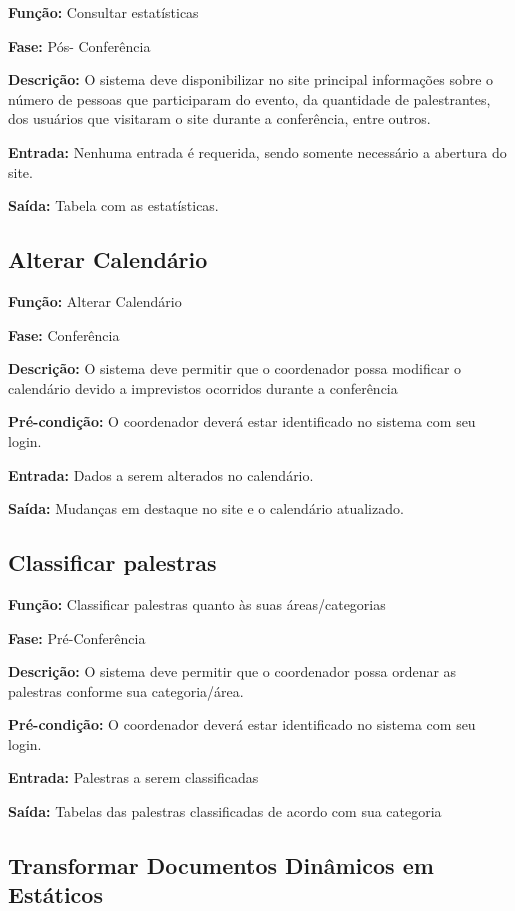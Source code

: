 \documentclass[letter]{article}
\begin{document}
\textbf{Função:}  Consultar estatísticas

\textbf{Fase:}  Pós- Conferência

\textbf{Descrição:}  O sistema deve disponibilizar no site principal informações sobre o número de pessoas que participaram do evento, da quantidade de palestrantes, dos usuários que visitaram o site durante a conferência, entre outros.

\textbf{Entrada:}  Nenhuma entrada é requerida, sendo somente necessário a abertura do site.

\textbf{Saída:}  Tabela com as estatísticas.
 

\subsection{Alterar Calendário}

\textbf{Função:} Alterar Calendário

\textbf{Fase:}  Conferência

\textbf{Descrição:}  O sistema deve permitir que o coordenador possa modificar o calendário devido a imprevistos ocorridos durante a conferência

\textbf{Pré-condição:}  O coordenador deverá estar identificado no sistema com seu login.

\textbf{Entrada:} Dados a serem alterados no calendário.

\textbf{Saída:}  Mudanças em destaque no site e o calendário atualizado.



\subsection{Classificar palestras}

\textbf{Função:} Classificar palestras quanto às suas áreas/categorias

\textbf{Fase:}  Pré-Conferência

\textbf{Descrição:}  O sistema deve permitir que o coordenador possa ordenar as palestras conforme sua categoria/área.

\textbf{Pré-condição:}  O coordenador deverá estar identificado no sistema com seu login.

\textbf{Entrada:}  Palestras a serem classificadas

\textbf{Saída:}  Tabelas das palestras classificadas de acordo com sua categoria



\subsection{Transformar Documentos Dinâmicos em Estáticos}
\end{document}
